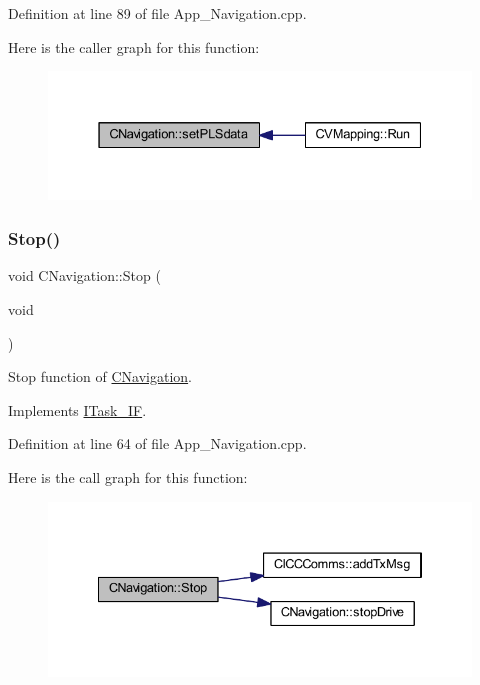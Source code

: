 Definition at line 89 of file App\+\_\+\+Navigation.\+cpp.

Here is the caller graph for this function\+:\nopagebreak
\begin{figure}[H]
\begin{center}
\leavevmode
\includegraphics[width=331pt]{class_c_navigation_a53f0409677e36f62ef232f7e15b32948_icgraph}
\end{center}
\end{figure}
\mbox{\label{class_c_navigation_a3cc8f7fdd003d6b2c5056b87ff93edd9}} 
\subsubsection{\texorpdfstring{Stop()}{Stop()}}
{\footnotesize\ttfamily void C\+Navigation\+::\+Stop (\begin{DoxyParamCaption}\item[{void}]{ }\end{DoxyParamCaption})\hspace{0.3cm}{\ttfamily [virtual]}}



Stop function of \mbox{\hyperlink{class_c_navigation}{C\+Navigation}}. 



Implements \mbox{\hyperlink{class_i_task___i_f_af5f8fba86704c7e36d0e4681d58300c6}{I\+Task\+\_\+\+IF}}.



Definition at line 64 of file App\+\_\+\+Navigation.\+cpp.

Here is the call graph for this function\+:\nopagebreak
\begin{figure}[H]
\begin{center}
\leavevmode
\includegraphics[width=334pt]{class_c_navigation_a3cc8f7fdd003d6b2c5056b87ff93edd9_cgraph}
\end{center}
\end{figure}
\mbox{\label{class_c_navigation_a06ce71124d487f1f9febf36a0e4b2a5d}} 
